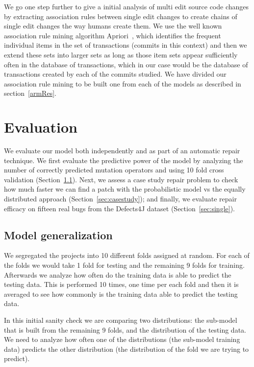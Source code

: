 \documentclass[conference]{IEEEtran}
\begin{document}
We go one step further to give a initial analysis of multi edit 
source code changes by extracting association rules between single edit changes 
to create chains of single edit changes the way humans create them.
%
We use the 
well known association rule mining algorithm
Apriori~\cite{Agrawal94,Liu98,Zaki2000}, which identifies the frequent 
individual items in the set of transactions (commits in this context) and then we extend these sets into 
larger sets as long as those item sets appear sufficiently often in the database 
of transactions, which in our case would be the database of transactions created 
by each of the commits studied. We have divided our association rule mining to be built one from each of the models as described in section~\ref{armRes}.

\section{Evaluation} \label{evaluation}

We evaluate our model both independently and as part of an automatic repair
technique.  We first evaluate the predictive power of the model by analyzing the number of correctly predicted mutation operators and using 10 fold cross validation (Section~\ref{sec:generalize}).  Next, we assess a case study
repair problem to check how 
much faster we can find a patch with the probabilistic model vs the equally 
distributed approach (Section~\ref{sec:casestudy}); and finally, we evaluate
repair efficacy on fifteen real bugs from the Defects4J dataset
(Section~\ref{sec:single}).

\subsection{Model generalization}
\label{sec:generalize}

We segregated the projects into 10 
different folds assigned at random. For each of the 
folds we would take 1 fold for testing and the remaining 9 folds for training. 
Afterwards we analyze how often do the training data is able to predict the 
testing data. This is performed 10 times, one time per each fold and then it is 
averaged to see how commonly is the training data able to predict the testing 
data.

In this initial sanity check we are comparing two distributions: the sub-model 
that is built from the remaining 9 folds, and the distribution of the testing 
data. We need to analyze how often one of the distributions (the sub-model 
training data) predicts the other distribution (the distribution of the fold we 
are trying to predict). 
\end{document}
